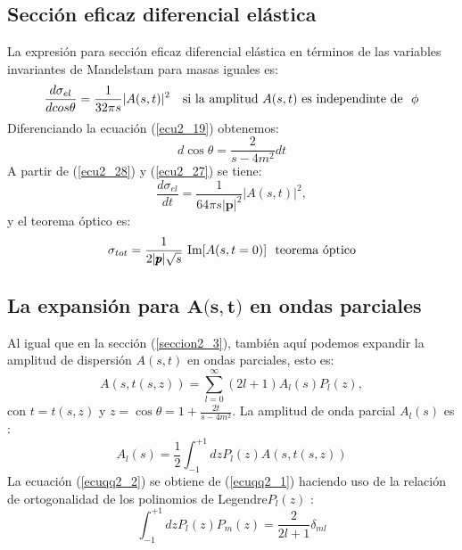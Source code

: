 \subsection*{Secci\'on eficaz diferencial el\'astica}
La expresi\'on para  secci\'on eficaz diferencial el\'astica en t\'erminos de las variables invariantes de  Mandelstam para masas iguales es:
\begin{equation}\label{ecu2_27}
\frac{d\sigma_{el}}{dcos\theta}=\frac{1}{32\pi s}|A(s,t)|^2\ \ \ \textup{si la amplitud $A(s,t)$ es independinte de} \ \ \phi
\end{equation}
Diferenciando la ecuaci\'on (\ref{ecu2_19}) obtenemos:
\begin{equation}\label{ecu2_28}
d\cos\theta=\frac{2}{s-4m^2}dt
\end{equation}
A partir de  (\ref{ecu2_28}) y (\ref{ecu2_27}) se tiene:
\begin{equation}\label{ecu2_29}
\frac{d\sigma_{el}}{dt}=\frac{1}{64\pi s |\pmb{p}|^2}|A(s,t)|^2,
\end{equation}
y el teorema \'optico es: \cite{varone,donachie}
\begin{equation}\label{ecu2_30}
\sigma_{tot}=\frac{1}{2|\pmb{p}|\sqrt{s}}\textup{ Im}[A(s,t=0)]\ \ \textup{teorema \'optico}
\end{equation}
\subsection*{La expansi\'on para ${\pmb A\pmb(\pmb s\pmb ,\pmb t\pmb)}$ en ondas parciales}
Al igual que en la secci\'on (\ref{seccion2_3}), tambi\'en aqu\'i podemos expandir la amplitud de dispersi\'on $A(s,t)$ en ondas  parciales, esto es:
\begin{equation}\label{ecuqq2_1}
A(s,t(s,z))=\sum^{\infty}_{l=0}(2l+1) A_{l}(s)P_l(z),
\end{equation}
con
$t=t(s,z)$ y  $z=\cos\theta=1+\frac{2t}{s-4m^2}$.
La amplitud de onda parcial $A_l(s)$ es \cite{donachie}:\newpage
\begin{equation}\label{ecuqq2_2}
A_l(s)=\frac{1}{2}\int^{+1}_{-1}dzP_l(z)A(s,t(s,z))
\end{equation}
La ecuaci\'on (\ref{ecuqq2_2}) se obtiene de (\ref{ecuqq2_1}) haciendo uso de la relaci\'on de ortogonalidad de los polinomios de Legendre$P_l(z)$ :
\begin{equation}
\int^{+1}_{-1}dzP_{l}(z)P_{m}(z)=\frac{2}{2l+1}\delta_{ml}
\end{equation}
